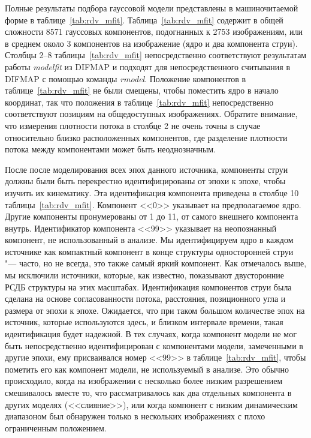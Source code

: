 Полные результаты подбора гауссовой модели представлены в машиночитаемой форме в
таблице~\ref{tab:rdv_mfit}. Таблица~\ref{tab:rdv_mfit} содержит в общей сложности 8571 гауссовых
компонентов, подогнанных к 2753 изображениям, или в среднем около 3 компонентов на изображение (ядро
и два компонента струи). Столбцы 2--8 таблицы~\ref{tab:rdv_mfit} непосредственно соответствуют
результатам работы \emph{modelfit} из DIFMAP и подходят для непосредственного считывания в DIFMAP с
помощью команды \emph{rmodel}. Положение компонентов в таблице~\ref{tab:rdv_mfit} не были смещены,
чтобы поместить ядро в начало координат, так что положения в таблице~\ref{tab:rdv_mfit}
непосредственно соответствуют позициям на общедоступных изображениях. Обратите внимание, что
измерения плотности потока в столбце 2 не очень точны в случае относительно близко расположенных
компонентов, где разделение плотности потока между компонентами может быть неоднозначным.

После после моделирования всех эпох данного источника, компоненты струи должны были быть перекрестно
идентифицированы от эпохи к эпохе, чтобы изучить их кинематику. Эта идентификация компонента
приведена в столбце 10 таблицы~\ref{tab:rdv_mfit}. Компонент <<0>> указывает на предполагаемое ядро.
Другие компоненты пронумерованы от 1 до 11, от самого внешнего компонента внутрь. Идентификатор
компонента <<99>> указывает на неопознанный компонент, не использованный в анализе. Мы
идентифицируем ядро в каждом источнике как компактный компонент в конце структуры односторонней
струи "--- часто, но не всегда, это также самый яркий компонент. Как отмечалось выше, мы исключили
источники, которые, как известно, показывают двусторонние РСДБ структуры на этих масштабах.
Идентификация компонентов струи была сделана на основе согласованности потока, расстояния,
позиционного угла и размера от эпохи к эпохе. Ожидается, что при таком большом количестве эпох на
источник, которые используются здесь, и близком интервале времени, такая идентификация будет
надежной. В тех случаях, когда компонент модели не мог быть непосредственно идентифицирован с
компонентами модели, замеченными в другие эпохи, ему присваивался номер <<99>> в
таблице~\ref{tab:rdv_mfit}, чтобы пометить его как компонент модели, не используемый в анализе. Это
обычно происходило, когда на изображении с несколько более низким разрешением смешивалось вместе то,
что рассматривалось как два отдельных компонента в других моделях (<<слияние>>), или когда компонент
с низким динамическим диапазоном был обнаружен только в нескольких изображениях с плохо ограниченным
положением.

